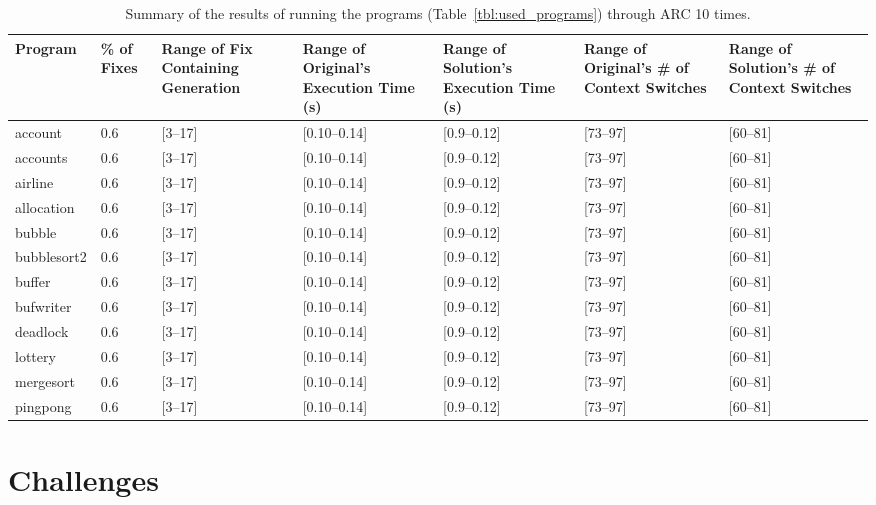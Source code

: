 \documentclass{llncs}
\begin{document}
\begin{table}[h]
\caption{Summary of the results of running the programs
(Table~\ref{tbl:used_programs}) through ARC 10 times.}
\begin{center}
\begin{tabular}{|p{2cm}|p{0.6cm}|p{1.75cm}|p{2cm}|p{2cm}|p{2cm}|p{2cm}|}
\hline
\textbf{Program} & \textbf{\% of Fixes} & \textbf{Range of Fix Containing Generation} & \textbf{Range of Original's Execution Time (s)} & \textbf{Range of Solution's Execution Time (s)} & \textbf{Range of Original's \# of Context Switches} & \textbf{Range of Solution's \# of Context Switches}\\
\hline
account & 0.6 & [3--17] & [0.10--0.14] & [0.9--0.12] & [73--97] & [60--81]\\
\hline
accounts & 0.6 & [3--17] & [0.10--0.14] & [0.9--0.12] & [73--97] & [60--81]\\
\hline
airline & 0.6 & [3--17] & [0.10--0.14] & [0.9--0.12] & [73--97] & [60--81]\\
\hline
allocation & 0.6 & [3--17] & [0.10--0.14] & [0.9--0.12] & [73--97] & [60--81]\\
\hline
bubble & 0.6 & [3--17] & [0.10--0.14] & [0.9--0.12] & [73--97] & [60--81]\\
\hline
bubblesort2 & 0.6 & [3--17] & [0.10--0.14] & [0.9--0.12] & [73--97] & [60--81]\\
\hline
buffer & 0.6 & [3--17] & [0.10--0.14] & [0.9--0.12] & [73--97] & [60--81]\\
\hline
bufwriter & 0.6 & [3--17] & [0.10--0.14] & [0.9--0.12] & [73--97] & [60--81]\\
\hline
deadlock & 0.6 & [3--17] & [0.10--0.14] & [0.9--0.12] & [73--97] & [60--81]\\
\hline
lottery & 0.6 & [3--17] & [0.10--0.14] & [0.9--0.12] & [73--97] & [60--81]\\
\hline
mergesort & 0.6 & [3--17] & [0.10--0.14] & [0.9--0.12] & [73--97] & [60--81]\\
\hline
pingpong & 0.6 & [3--17] & [0.10--0.14] & [0.9--0.12] & [73--97] & [60--81]\\
\hline
\end{tabular}
\label{tbl:summary_results}
\end{center}
\end{table}


\section{Challenges}
\label{sec:challenges}
\end{document}
